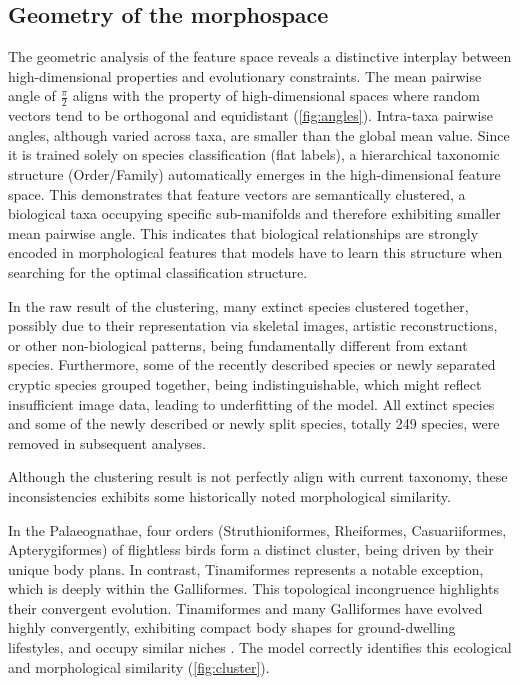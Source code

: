 \subsection{Geometry of the morphospace}\label{subsec:geometry-of-the-morphospace}

The geometric analysis of the feature space reveals a distinctive interplay
between high-dimensional properties and evolutionary constraints.
The mean pairwise angle of $\frac{\pi}{2}$ aligns with the
property of high-dimensional spaces where random vectors tend to
be orthogonal and equidistant (\cref{fig:angles}).
Intra-taxa pairwise angles, although varied across taxa, are
smaller than the global mean value.
Since it is trained solely on species classification (flat labels),
a hierarchical taxonomic structure (Order/Family) automatically emerges in the high-dimensional feature space.
This demonstrates that feature vectors are semantically clustered,
a biological taxa occupying specific sub-manifolds and therefore exhibiting smaller
mean pairwise angle. This indicates that biological relationships are strongly encoded
in morphological features that models have to learn this structure when
searching for the optimal classification structure.

In the raw result of the clustering, many extinct species clustered together,
possibly due to their representation via skeletal images, artistic reconstructions, or
other non-biological patterns, being fundamentally different from extant species.
Furthermore, some of the recently described species or newly separated cryptic species grouped
together, being indistinguishable, which might reflect insufficient image data, leading to
underfitting of the model. All extinct species and some of the newly described or
newly split species, totally 249 species, were removed in subsequent analyses.

Although the clustering result is not perfectly align with current taxonomy,
these inconsistencies exhibits some historically noted morphological similarity.

In the Palaeognathae, four orders (Struthioniformes, Rheiformes, Casuariiformes, Apterygiformes)
of flightless birds form a distinct cluster, being driven by their unique body plans. In contrast,
Tinamiformes represents a notable exception, which is deeply within the Galliformes.
This topological incongruence highlights their convergent evolution. Tinamiformes and many Galliformes
have evolved highly convergently, exhibiting compact body shapes for ground-dwelling lifestyles,
and occupy similar niches \parencite{Glenny1946Systematic}. The model correctly identifies
this ecological and morphological similarity (\cref{fig:cluster}).

